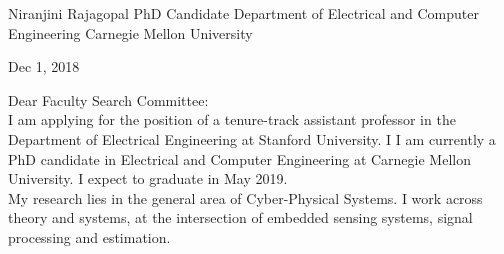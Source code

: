 \documentclass[10pt]{article}
\date{}
\begin{document}



Niranjini Rajagopal
PhD Candidate
Department of Electrical and Computer Engineering
Carnegie Mellon University

Dec 1, 2018

Dear Faculty Search Committee:\\


I am applying for the position of a tenure-track assistant professor in the Department of Electrical Engineering at Stanford University. I 
I am currently a PhD candidate in Electrical and Computer Engineering at Carnegie Mellon University. I expect to graduate in May 2019. \\

My research lies in the general area of Cyber-Physical Systems. I work across theory and systems, at the intersection of embedded sensing systems, signal processing and estimation. 




\end{document}
